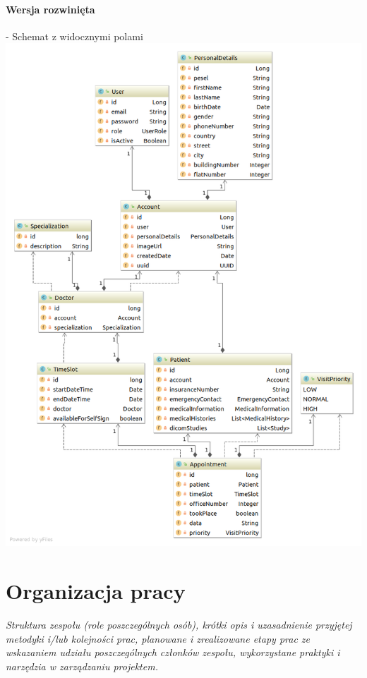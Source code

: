 \documentclass[polish,12pt]{aghthesis}
\begin{document}
\paragraph{Wersja rozwinięta} - Schemat z widocznymi polami \\
\includegraphics[width=\textwidth]{java-entities-big}

\section{Organizacja pracy}
\label{sec:organizacja-pracy}

\emph{Struktura zespołu (role poszczególnych osób), krótki opis i
  uzasadnienie przyjętej metodyki i/lub kolejności prac, planowane i
  zrealizowane etapy prac ze wskazaniem udziału poszczególnych
  członków zespołu, wykorzystane praktyki i narzędzia w zarządzaniu
  projektem.}
  
\end{document}
